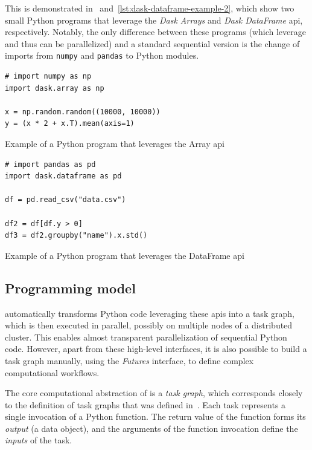 This is demonstrated in~ and~\ref{lst:dask-dataframe-example-2}, which show two
small Python programs that leverage the \emph{Dask Arrays} and \emph{Dask DataFrame}
\gls{api}, respectively. Notably, the only difference between these programs
(which leverage \dask{} and thus can be parallelized) and a standard sequential
version is the change of imports from \texttt{numpy} and \texttt{pandas}
to \dask{} Python modules.

\begin{listing}[h]
	\begin{verbatim}
# import numpy as np
import dask.array as np

x = np.random.random((10000, 10000))
y = (x * 2 + x.T).mean(axis=1)
	\end{verbatim}
	\caption{Example of a Python program that leverages the \dask{} Array
	\gls{api}}
	\label{lst:dask-array-example}
\end{listing}

\begin{listing}[h]
	\begin{verbatim}
# import pandas as pd
import dask.dataframe as pd

df = pd.read_csv("data.csv")

df2 = df[df.y > 0]
df3 = df2.groupby("name").x.std()
	\end{verbatim}
	\caption{Example of a Python program that leverages the \dask{} DataFrame
	\gls{api}}
	\label{lst:dask-dataframe-example-2}
\end{listing}

\subsection*{Programming model}
\dask{} automatically transforms Python code leveraging these
\glspl{api} into a task graph, which is then executed in parallel, possibly on
multiple nodes of a distributed cluster. This enables almost transparent parallelization of
sequential Python code. However, apart from these high-level interfaces, it is also possible to
build a task graph manually, using the \emph{Futures} interface, to define complex
computational workflows.

The core computational abstraction of \dask{} is a \emph{task graph},
which corresponds closely to the definition of task graphs that was defined
in~. Each task represents a single invocation of a Python function. The
return value of the function forms its \emph{output} (a data object), and the arguments of the
function invocation define the \emph{inputs} of the task.

